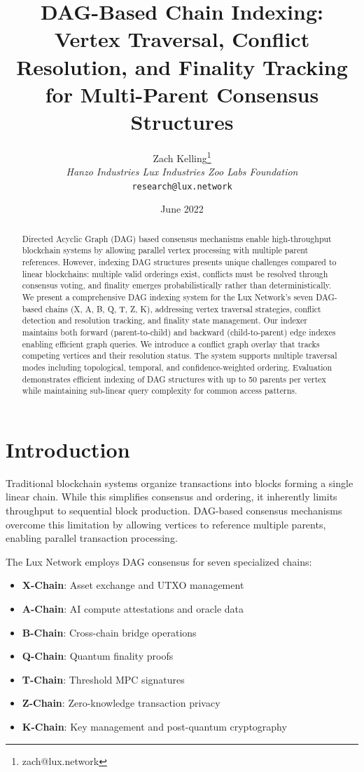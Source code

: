 \documentclass[11pt,twocolumn]{article}
\title{DAG-Based Chain Indexing: Vertex Traversal, Conflict Resolution, and Finality Tracking for Multi-Parent Consensus Structures}
\author{Zach Kelling\thanks{zach@lux.network} \\ \textit{Hanzo Industries \quad Lux Industries \quad Zoo Labs Foundation} \\ \texttt{research@lux.network}}
\date{June 2022}
\begin{document}
\maketitle

\begin{abstract}
Directed Acyclic Graph (DAG) based consensus mechanisms enable high-throughput blockchain systems by allowing parallel vertex processing with multiple parent references. However, indexing DAG structures presents unique challenges compared to linear blockchains: multiple valid orderings exist, conflicts must be resolved through consensus voting, and finality emerges probabilistically rather than deterministically. We present a comprehensive DAG indexing system for the Lux Network's seven DAG-based chains (X, A, B, Q, T, Z, K), addressing vertex traversal strategies, conflict detection and resolution tracking, and finality state management. Our indexer maintains both forward (parent-to-child) and backward (child-to-parent) edge indexes enabling efficient graph queries. We introduce a conflict graph overlay that tracks competing vertices and their resolution status. The system supports multiple traversal modes including topological, temporal, and confidence-weighted ordering. Evaluation demonstrates efficient indexing of DAG structures with up to 50 parents per vertex while maintaining sub-linear query complexity for common access patterns.
\end{abstract}

\section{Introduction}

Traditional blockchain systems organize transactions into blocks forming a single linear chain. While this simplifies consensus and ordering, it inherently limits throughput to sequential block production. DAG-based consensus mechanisms~\cite{avalanche} overcome this limitation by allowing vertices to reference multiple parents, enabling parallel transaction processing.

The Lux Network employs DAG consensus for seven specialized chains:

\begin{itemize}
\item \textbf{X-Chain}: Asset exchange and UTXO management
\item \textbf{A-Chain}: AI compute attestations and oracle data
\item \textbf{B-Chain}: Cross-chain bridge operations
\item \textbf{Q-Chain}: Quantum finality proofs
\item \textbf{T-Chain}: Threshold MPC signatures
\item \textbf{Z-Chain}: Zero-knowledge transaction privacy
\item \textbf{K-Chain}: Key management and post-quantum cryptography
\end{itemize}
\end{document}
